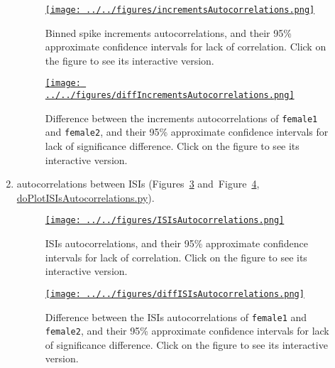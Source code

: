 \documentclass[10pt]{article}
\begin{document}
\begin{enumerate}
\begin{figure}
    \href{http://www.gatsby.ucl.ac.uk/~rapela/singleNeuronSpikesAnalysisTutorial/figures/incrementsAutocorrelations.html}{\texttt{[image: ../../figures/incrementsAutocorrelations.png]}}
    \caption{Binned spike increments autocorrelations, and their 95\% approximate confidence intervals for lack of correlation. Click on the figure to see its interactive version.}
    \label{fig:incrementsAutocorrelations}
\end{figure}

\begin{figure}
    \href{http://www.gatsby.ucl.ac.uk/~rapela/singleNeuronSpikesAnalysisTutorial/figures/diffIncrementsAutocorrelations.html}{\texttt{[image: ../../figures/diffIncrementsAutocorrelations.png]}}
    \caption{Difference between the increments autocorrelations of \texttt{female1} and \texttt{female2}, and their 95\% approximate confidence intervals for lack of significance difference. Click on the figure to see its interactive version.}
    \label{fig:diffIncrementsAutocorrelations}
\end{figure}

    \item autocorrelations between ISIs (Figures~\ref{fig:ISIsAutocorrelations} and~Figure~\ref{fig:diffISIsAutocorrelations}, \href{https://github.com/joacorapela/singleNeuronSpikesAnalysisTutorial/blob/master/code/scripts/doPlotISIsAutocorrelations.py}{doPlotISIsAutocorrelations.py}).

\begin{figure}
    \href{http://www.gatsby.ucl.ac.uk/~rapela/singleNeuronSpikesAnalysisTutorial/figures/ISIsAutocorrelations.html}{\texttt{[image: ../../figures/ISIsAutocorrelations.png]}}
    \caption{ISIs autocorrelations, and their 95\% approximate confidence intervals for lack of correlation. Click on the figure to see its interactive version.}
    \label{fig:ISIsAutocorrelations}
\end{figure}

\begin{figure}
    \href{http://www.gatsby.ucl.ac.uk/~rapela/singleNeuronSpikesAnalysisTutorial/figures/diffISIsAutocorrelations.html}{\texttt{[image: ../../figures/diffISIsAutocorrelations.png]}}
    \caption{Difference between the ISIs autocorrelations of \texttt{female1} and \texttt{female2}, and their 95\% approximate confidence intervals for lack of significance difference. Click on the figure to see its interactive version.}
    \label{fig:diffISIsAutocorrelations}
\end{figure}

\end{enumerate}
\end{document}
